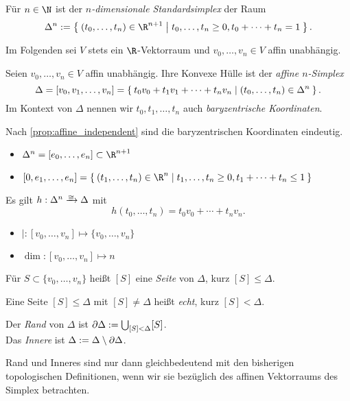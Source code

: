 \begin{df}
	Für $n \in \N$ ist der \emph{$n$-dimensionale Standardsimplex} der Raum
	\[
		\Delta^n := \Set{ (t_0, \dotsc, t_n) \in \R^{n+1} | t_0, \dotsc, t_n \ge 0, t_0 + \dotsb + t_n = 1 }.
	\]
\end{df}

\begin{conv}
	Im Folgenden sei $V$ stets ein $\R$-Vektorraum und $v_0, \dotsc, v_n \in V$ affin unabhängig.
\end{conv}

\begin{df}
	Seien $v_0, \dotsc, v_n \in V$ affin unabhängig.
	Ihre Konvexe Hülle ist der \emph{affine $n$-Simplex}
	\[
		\Delta = [v_0, v_1, \dotsc, v_n]
		= \Set{ t_0v_0 + t_1v_1 + \dotsb + t_nv_n | (t_0, \dotsc, t_n) \in \Delta^n }.
	\]
	Im Kontext von $\Delta$ nennen wir $t_0, t_1, \dotsc, t_n$ auch \emph{baryzentrische Koordinaten}.
	\begin{note}
		Nach \ref{prop:affine_independent} sind die baryzentrischen Koordinaten eindeutig.
	\end{note}
\end{df}

\begin{ex}
	\begin{itemize}
		\item
			$\Delta^n = [e_0, \dotsc, e_n] \subset \R^{n+1}$
		\item
			$[0,e_1,\dotsc,e_n] = \Set{ (t_1, \dotsc, t_n) \in \R^n | t_1, \dotsc, t_n \ge 0, t_1 + \dotsb + t_n \le 1 }$
	\end{itemize}
\end{ex}

\begin{nt}
	Es gilt $h: \Delta^n \homto \Delta$ mit
	\[
		h(t_0, \dotsc, t_n) = t_0 v_0 + \dotsb + t_n v_n.
	\]
	\begin{itemize}
		\item
			$\vert: [v_0, \dotsc, v_n] \mapsto \{v_0, \dotsc, v_n\}$
		\item
			$\dim: [v_0, \dotsc, v_n] \mapsto n$
	\end{itemize}
\end{nt}

\begin{df}
	Für $S \subset \{v_0, \dotsc, v_n\}$ heißt $[S]$ eine \emph{Seite} von $\Delta$, kurz $[S] \le \Delta$.

	Eine Seite $[S] \le \Delta$ mit $[S] \neq \Delta$ heißt \emph{echt}, kurz $[S] < \Delta$.

	Der \emph{Rand} von $\Delta$ ist $\partial \Delta := \bigcup_{[S] < \Delta} [S]$. \\
	Das \emph{Innere} ist $\Delta := \Delta \setminus \partial \Delta$.

	\begin{note}
		Rand und Inneres sind nur dann gleichbedeutend mit den bisherigen topologischen Definitionen, wenn wir sie bezüglich des affinen Vektorraums des Simplex betrachten.
	\end{note}
\end{df}



